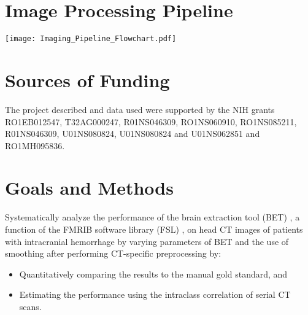 \documentclass[final]{beamer}\usepackage[]{graphicx}\usepackage[]{color}
\begin{document}
\begin{frame}[fragile]
\begin{minipage}{0.2\linewidth}
\section{Image Processing Pipeline}
\texttt{[image: Imaging\_Pipeline\_Flowchart.pdf]}
\section{Sources of Funding}
{\scriptsize
The project described and data used were supported by the NIH grants RO1EB012547, T32AG000247, R01NS046309, RO1NS060910, RO1NS085211, R01NS046309, U01NS080824, U01NS080824 and U01NS062851 and RO1MH095836.
}
\end{minipage}
\begin{minipage}{0.39\linewidth}







\section{Goals and Methods}
\begin{multicols}{2}
Systematically analyze the performance of the brain extraction tool (BET) \citep{smith_fast_2002}, a function of the FMRIB software library (FSL) \citep{jenkinson_fsl_2012}, on head CT images of patients with intracranial hemorrhage by varying parameters of BET and the use of smoothing after performing CT-specific preprocessing by:
\begin{itemize}
\item Quantitatively comparing the results to the manual gold standard, and
\item Estimating the performance using the intraclass correlation of serial CT scans.
\end{itemize}


\vfill
\columnbreak





\end{multicols}
\end{minipage}
\end{frame}
\end{document}
